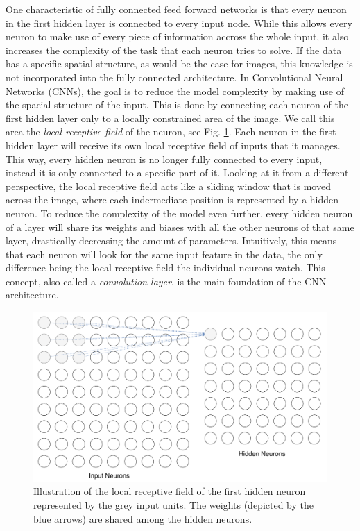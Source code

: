 One characteristic of fully connected feed forward networks is that
every neuron in the first hidden layer is connected to every input
node. While this allows every neuron to make use of every piece of
information accross the whole input, it also increases the complexity
of the task that each neuron tries to solve. If the data has a
specific spatial structure, as would be the case for images, this
knowledge is not incorporated into the fully connected
architecture. In Convolutional Neural Networks (CNNs), the goal is to
reduce the model complexity by making use of the spacial structure of
the input. This is done by connecting each neuron of the first hidden
layer only to a locally constrained area of the image. We call this
area the \textit{local receptive field} of the neuron, see
Fig. \ref{fig:receptive-field}. Each neuron in
the first hidden layer will receive its own local receptive field of
inputs that it manages. This way, every hidden
neuron is no longer fully connected to every input, instead it is only connected to a
specific part of it. Looking at it
from a different perspective, the local receptive field acts like a
sliding window that is moved across the image, where each indermediate
position is represented by a hidden neuron. To reduce the complexity
of the model even further, every hidden neuron of a layer will share
its weights and biases with all the other neurons of that same layer,
drastically decreasing the amount of parameters. Intuitively, this
means that each neuron will look for the same input feature in the
data, the only difference being the local receptive field the
individual neurons watch. This concept, also called a
\textit{convolution layer}, is the main foundation of the CNN
architecture.
\begin{figure}[h]
  \centering
  \includegraphics[width=\textwidth]{../figures/receptive_field}
  \caption{Illustration of the local receptive field of the first
    hidden neuron represented by the grey input units. The weights
    (depicted by the blue arrows) are shared among the hidden
    neurons.}
  \label{fig:receptive-field}
\end{figure}

